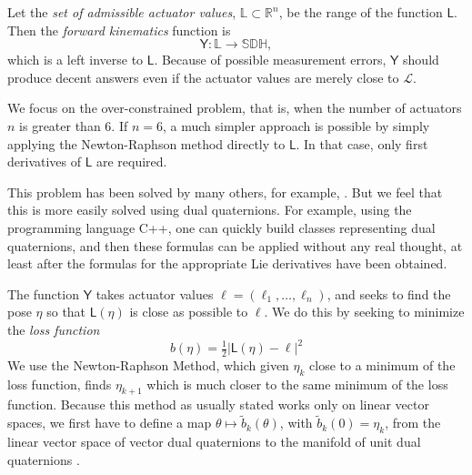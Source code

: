\documentclass[reqno,12pt]{amsart}
\newcommand\setunitdualquat{\mathbb S\mathbb D\mathbb H}
\begin{document}
Let the \emph{set of admissible actuator values}, $\mathbb L \subset \mathbb R^n$, be the range of the function $\mathsf L$.  Then the \emph{forward kinematics} function is
\begin{equation}
\mathsf Y : \mathbb L \to \setunitdualquat,
\end{equation}
 which is a left inverse to $\mathsf L$.  Because of possible measurement errors, $\mathsf Y$ should produce decent answers even if the actuator values are merely close to $\mathcal L$.  

We focus on the over-constrained problem, that is, when the number of actuators $n$ is greater than $6$.  If $n = 6$, a much simpler approach is possible by simply applying the Newton-Raphson method directly to $\mathsf L$.  In that case, only first derivatives of $\mathsf L$ are required.

This problem has been solved by many others, for example, \cite{pott-schmidt,yang-et-al}.  But we feel that this is more easily solved using dual quaternions.  For example, using the programming language C++, one can quickly build classes representing dual quaternions, and then these formulas can be applied without any real thought, at least after the formulas for the appropriate Lie derivatives have been obtained.

The function $\mathsf Y$ takes actuator values $\bm\ell = (\ell_1,\dots,\ell_n)$, and seeks to find the pose $\eta$ so that $\mathsf L(\eta)$ is close as possible to $\bm\ell$.  We do this by seeking to minimize the \emph{loss function}
\begin{equation}
b(\eta) = \tfrac12 {|\mathsf L(\eta) - \bm\ell|}^2
\end{equation}
We use the Newton-Raphson Method, which given $\eta_k$ close to a minimum of the loss function, finds $\eta_{k+1}$ which is much closer to the same minimum of the loss function.  Because this method as usually stated works only on linear vector spaces, we first have to define a map $\theta\mapsto\tilde b_k(\theta)$, with $\tilde b_k(0) = \eta_k$, from the linear vector space of vector dual quaternions to the manifold of unit dual quaternions \cite{huper-trumpf}.
\end{document}
